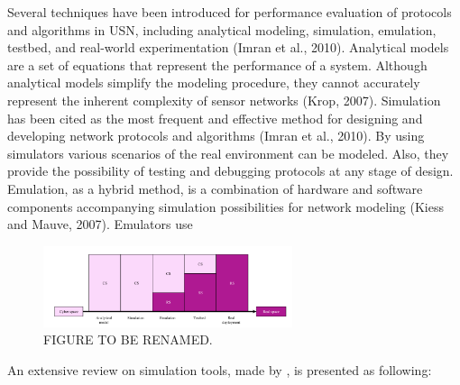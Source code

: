 Several techniques have been introduced for performance evaluation of protocols and algorithms in USN, including analytical modeling,
simulation, emulation, testbed, and real-world experimentation (Imran
et al., 2010). Analytical models are a set of equations that represent the
performance of a system. Although analytical models simplify the
modeling procedure, they cannot accurately represent the inherent
complexity of sensor networks (Krop, 2007). Simulation has been cited
as the most frequent and effective method for designing and developing
network protocols and algorithms (Imran et al., 2010). By using
simulators various scenarios of the real environment can be modeled.
Also, they provide the possibility of testing and debugging protocols at
any stage of design. Emulation, as a hybrid method, is a combination of
hardware and software components accompanying simulation possibilities for network modeling (Kiess and Mauve, 2007). Emulators use

\begin{figure}[h!]
	\centering
	\includegraphics[width=0.65\textwidth,keepaspectratio]{figures/simul_VS_emul}
	\caption{FIGURE TO BE RENAMED.}
	
\end{figure}

An extensive review on simulation tools, made by \cite{nayyar2015}, is presented as following:

